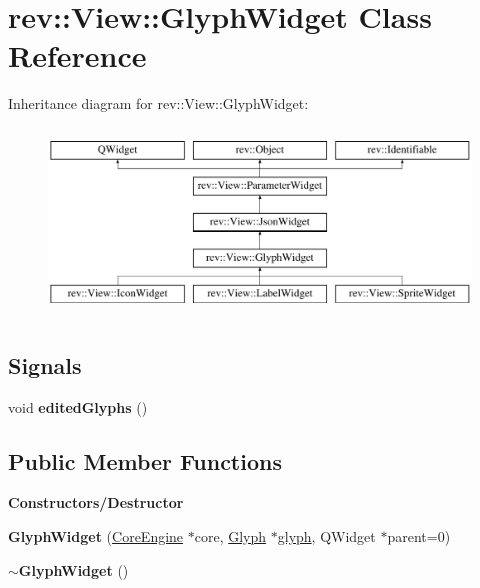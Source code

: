 \hypertarget{classrev_1_1_view_1_1_glyph_widget}{}\section{rev\+::View\+::Glyph\+Widget Class Reference}
\label{classrev_1_1_view_1_1_glyph_widget}
Inheritance diagram for rev\+::View\+::Glyph\+Widget\+:\begin{figure}[H]
\begin{center}
\leavevmode
\includegraphics[height=5.000000cm]{classrev_1_1_view_1_1_glyph_widget}
\end{center}
\end{figure}
\subsection*{Signals}
\begin{DoxyCompactItemize}
\item 
\mbox{\label{classrev_1_1_view_1_1_glyph_widget_a5c8ad70ff253102032e2dd7d637454fa}} 
void {\bfseries edited\+Glyphs} ()
\end{DoxyCompactItemize}
\subsection*{Public Member Functions}
\begin{Indent}\textbf{ Constructors/\+Destructor}\par
\begin{DoxyCompactItemize}
\item 
\mbox{\label{classrev_1_1_view_1_1_glyph_widget_a8825cb701fe8060568cdc68e41b098ac}} 
{\bfseries Glyph\+Widget} (\mbox{\hyperlink{classrev_1_1_core_engine}{Core\+Engine}} $\ast$core, \mbox{\hyperlink{classrev_1_1_glyph}{Glyph}} $\ast$\mbox{\hyperlink{classrev_1_1_view_1_1_glyph_widget_a43f81f8b0cc76b58cd84103d920021ba}{glyph}}, Q\+Widget $\ast$parent=0)
\item 
\mbox{\label{classrev_1_1_view_1_1_glyph_widget_a428c5cf8a117f9b237ab0458cc127fc1}} 
{\bfseries $\sim$\+Glyph\+Widget} ()
\end{DoxyCompactItemize}
\end{Indent}
